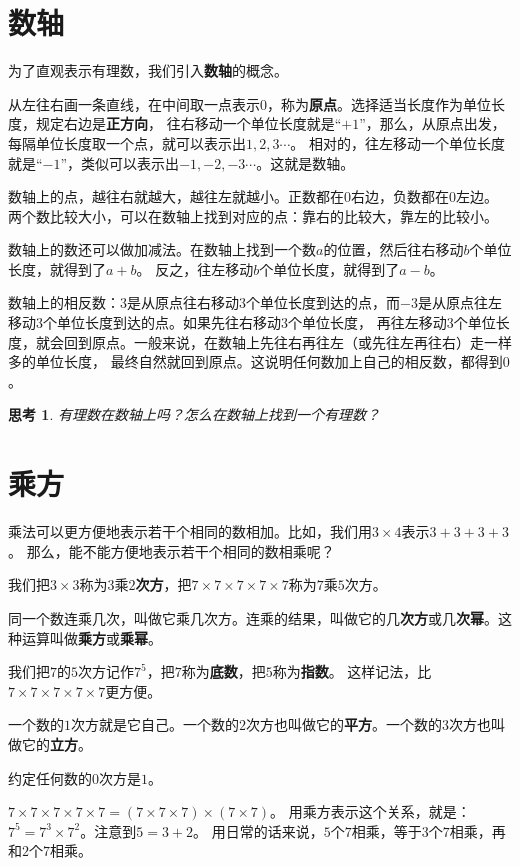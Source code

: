 \documentclass[12pt,UTF8]{ctexbook}
\newtheorem{sk}{思考}[section]
\begin{document}
\section{数轴}
为了直观表示有理数，我们引入\textbf{数轴}的概念。

从左往右画一条直线，在中间取一点表示$0$，称为\textbf{原点}。选择适当长度作为单位长度，规定右边是\textbf{正方向}，
往右移动一个单位长度就是“$+1$”，那么，从原点出发，每隔单位长度取一个点，就可以表示出$1,2,3\cdots$。
相对的，往左移动一个单位长度就是“$-1$”，类似可以表示出$-1,-2,-3\cdots$。这就是数轴。

数轴上的点，越往右就越大，越往左就越小。正数都在$0$右边，负数都在$0$左边。
两个数比较大小，可以在数轴上找到对应的点：靠右的比较大，靠左的比较小。

数轴上的数还可以做加减法。在数轴上找到一个数$a$的位置，然后往右移动$b$个单位长度，就得到了$a+b$。
反之，往左移动$b$个单位长度，就得到了$a-b$。

数轴上的相反数：$3$是从原点往右移动$3$个单位长度到达的点，而$-3$是从原点往左移动$3$个单位长度到达的点。如果先往右移动$3$个单位长度，
再往左移动$3$个单位长度，就会回到原点。一般来说，在数轴上先往右再往左（或先往左再往右）走一样多的单位长度，
最终自然就回到原点。这说明任何数加上自己的相反数，都得到$0$。

\begin{sk}\label{sk:0-2-0}
    有理数在数轴上吗？怎么在数轴上找到一个有理数？
\end{sk}

\section{乘方}
乘法可以更方便地表示若干个相同的数相加。比如，我们用$3 \times 4$表示$3+3+3+3$。
那么，能不能方便地表示若干个相同的数相乘呢？

我们把$3\times 3$称为$3$乘$2$\textbf{次方}，把$7\times 7\times 7\times 7\times 7$称为$7$乘$5$次方。

同一个数连乘几次，叫做它乘几次方。连乘的结果，叫做它的几\textbf{次方}或几\textbf{次幂}。这种运算叫做\textbf{乘方}或\textbf{乘幂}。

我们把$7$的$5$次方记作$7^5$，把$7$称为\textbf{底数}，把$5$称为\textbf{指数}。
这样记法，比$7\times 7\times 7\times 7\times 7$更方便。

一个数的$1$次方就是它自己。一个数的$2$次方也叫做它的\textbf{平方}。一个数的$3$次方也叫做它的\textbf{立方}。

约定任何数的$0$次方是$1$。

$7\times 7\times 7\times 7\times 7 = (7\times 7\times 7)\times (7\times 7)$。
用乘方表示这个关系，就是：$7^5 = 7^3 \times 7^2$。注意到$5 = 3 + 2$。
用日常的话来说，$5$个$7$相乘，等于$3$个$7$相乘，再和$2$个$7$相乘。
\end{document}
